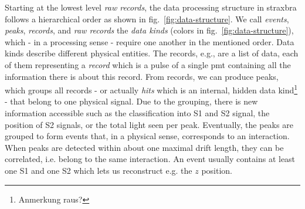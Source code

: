 Starting at the lowest level \emph{raw records}, the data processing structure in straxbra follows a hierarchical order as shown in fig.~\ref{fig:data-structure}.
We call \emph{events}, \emph{peaks}, \emph{records}, and \emph{raw records} the \emph{data kinds} (colors in fig.~\ref{fig:data-structure}), which - in a processing sense - require one another in the mentioned order.
Data kinds describe different physical entities.
The records, e.g., are a list of data, each of them representing a \emph{record} which is a pulse of a single \gls{pmt} containing all the information there is about this record.
From records, we can produce peaks, which groups all records - or actually \emph{hits} which is an internal, hidden data kind\footnote{Anmerkung raus?} - that belong to one physical signal.
Due to the grouping, there is new information accessible such as the classification into S1 and S2 signal, the position of S2 signals, or the total light seen per peak.
Eventually, the peaks are grouped to form events that, in a physical sense, corresponds to an interaction.
When peaks are detected within about one maximal drift length, they can be correlated, i.e. belong to the same interaction.
An event usually contains at least one S1 and one S2 which lets us reconstruct e.g. the $ z $ position.


